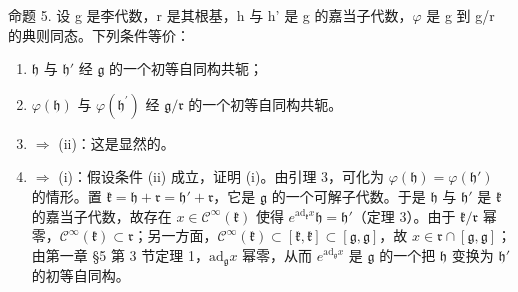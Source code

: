 命题 5. 设 g 是李代数，r 是其根基，h 与 h' 是 g 的嘉当子代数，\(\varphi\) 是 g 到 g/r 的典则同态。下列条件等价：

\begin{enumerate}
\def\labelenumi{(\roman{enumi})}
\item
  \(\mathfrak{h}\) 与 \(\mathfrak{h}'\) 经 \(\mathfrak{g}\) 的一个初等自同构共轭；
\item
  \(\varphi (\mathfrak{h})\) 与 \(\varphi (\mathfrak{h}^{\prime})\) 经 \(\mathfrak{g} / \mathfrak{r}\) 的一个初等自同构共轭。
\item
  \(\Longrightarrow\) (ii)：这是显然的。
\item
  \(\Longrightarrow\) (i)：假设条件 (ii) 成立，证明 (i)。由引理 3，可化为 \(\varphi(\mathfrak{h}) = \varphi(\mathfrak{h}')\) 的情形。置 \(\mathfrak{k} = \mathfrak{h} + \mathfrak{r} = \mathfrak{h}' + \mathfrak{r}\)，它是 \(\mathfrak{g}\) 的一个可解子代数。于是 \(\mathfrak{h}\) 与 \(\mathfrak{h}'\) 是 \(\mathfrak{k}\) 的嘉当子代数，故存在 \(x \in \mathcal{C}^{\infty}(\mathfrak{k})\) 使得 \(e^{\mathrm{ad}_{\mathfrak{k}}x}\mathfrak{h} = \mathfrak{h}'\)（定理 3）。由于 \(\mathfrak{k}/\mathfrak{r}\) 幂零，\(\mathcal{C}^{\infty}(\mathfrak{k}) \subset \mathfrak{r}\)；另一方面，\(\mathcal{C}^{\infty}(\mathfrak{k}) \subset [\mathfrak{k},\mathfrak{k}] \subset [\mathfrak{g},\mathfrak{g}]\)，故 \(x \in \mathfrak{r} \cap [\mathfrak{g},\mathfrak{g}]\)；由第一章 §5 第 3 节定理 1，\(\mathrm{ad}_{\mathfrak{g}}x\) 幂零，从而 \(e^{\mathrm{ad}_{\mathfrak{g}}x}\) 是 \(\mathfrak{g}\) 的一个把 \(\mathfrak{h}\) 变换为 \(\mathfrak{h}'\) 的初等自同构。
\end{enumerate}

